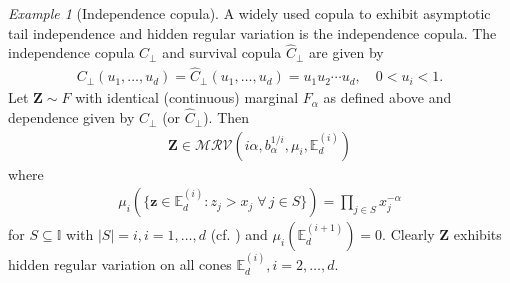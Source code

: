 \documentclass[aos]{imsart}
\numberwithin{equation}{section}
\theoremstyle{plain} %
\theoremstyle{remark}
\newtheorem{example}[theorem]{Example}
\newcommand{\E}{\mathbb{E}}
\newcommand{\VF}[1]{{\color{blue} #1}}
\def\MRV{\mathcal{MRV}}
\def\bZ{\boldsymbol Z}
\def\bz{\boldsymbol z}
\newcommand{\DAS}[1]{{\color{red} #1}}
\begin{document}
\begin{example}[Independence copula]\label{ex:cop:ind}
A widely used copula to exhibit {asymptotic tail independence} and {hidden regular variation} is the independence  copula. The independence copula ${C}_{\perp}$ and survival copula $\widehat{C}_{\perp}$ are given by
\begin{align}\label{eq:scop:ind}
   {C}_{\perp}(u_1,\ldots,u_d) = \widehat{C}_{\perp}(u_1,\ldots,u_d) = u_1u_2\cdots u_d, \quad 0 < u_i <1.
\end{align}
Let $\bZ\sim F$ with identical (continuous) marginal $F_{\alpha}$ as defined above and dependence given by $C_{\perp}$ (or $\widehat{C}_{\perp}$). Then
\begin{align}\label{eq:mrvhrv:ind}
    \bZ\in \MRV(i\alpha,b_{\alpha}^{1/i}, \mu_i,\E_d^{(i)})
\end{align}
where
\begin{eqnarray} \label{eq:mrvhrv:mui}
            \mu_i\left(\{\bz\in \E_d^{(i)}:z_j>x_j\; \forall\, j \in S\}\right)=\prod_{j\in S} x_j^{-\alpha}
           \end{eqnarray}
for $S\subseteq \mathbb{I}$ with $|S|=i, i =1,\ldots, d$ (cf. \cite{das:fasen:kluppelberg:2022}) and $\mu_i(\E_d^{(i+1)})=0$. Clearly $\bZ$ exhibits hidden regular variation on all cones $\E_d^{(i)}, i=2,\ldots, d$.

\end{example} %
\end{document}
